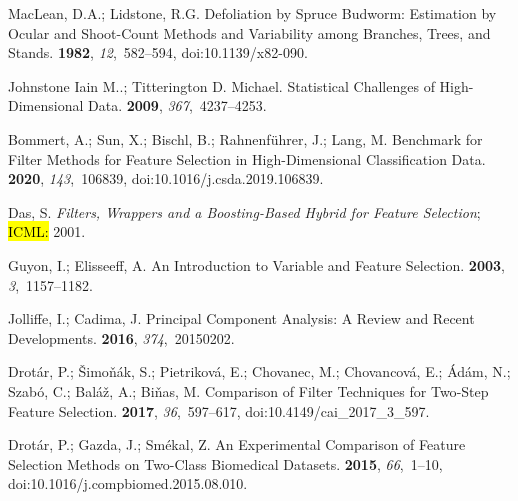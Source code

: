 \documentclass[remotesensing,article,accept,moreauthors,pdftex]{Definitions/mdpi}
\begin{document}
\begin{thebibliography}{999}
MacLean, D.A.; Lidstone, R.G.
\newblock Defoliation by Spruce Budworm: Estimation by Ocular and Shoot-Count
  Methods and Variability among Branches, Trees, and Stands.
 {\bf 1982}, {\em
  12},~582--594, doi:10.1139/x82-090.

{Johnstone Iain M.}.; {Titterington D. Michael}.
\newblock Statistical Challenges of High-Dimensional Data.
 {\bf 2009}, {\em 367},~4237--4253.

Bommert, A.; Sun, X.; Bischl, B.; Rahnenf{\"u}hrer, J.; Lang, M.
\newblock Benchmark for Filter Methods for Feature Selection in
  High-Dimensional Classification Data.
 {\bf 2020}, {\em
  143},~106839, doi:10.1016/j.csda.2019.106839.

Das, S.
\newblock \emph{Filters, {{Wrappers}} and a {{Boosting}}-{{Based Hybrid}} for
  {{Feature Selection}}};
\newblock  \hl{{{ICML}}:} %
  2001.

Guyon, I.; Elisseeff, A.
\newblock An Introduction to Variable and Feature Selection.
 {\bf 2003}, {\em
  3},~1157--1182.

Jolliffe, I.; Cadima, J.
\newblock Principal Component Analysis: A Review and Recent Developments.
 {\bf 2016}, {\em 374},~20150202.

Drot{\'a}r, P.; {\v S}imo{\v n}{\'a}k, S.; Pietrikov{\'a}, E.; Chovanec, M.;
  Chovancov{\'a}, E.; {\'A}d{\'a}m, N.; Szab{\'o}, C.; Bal{\'a}{\v z}, A.;
  Bi{\v n}as, M.
\newblock Comparison of {{Filter Techniques}} for {{Two}}-{{Step Feature
  Selection}}.
 {\bf 2017}, {\em 36},~597--617, doi:10.4149/cai\_2017\_3\_597.

Drot{\'a}r, P.; Gazda, J.; Sm{\'e}kal, Z.
\newblock An Experimental Comparison of Feature Selection Methods on Two-Class
  Biomedical Datasets.
 {\bf 2015}, {\em 66},~1--10, doi:10.1016/j.compbiomed.2015.08.010.


\end{thebibliography}
\end{document}

